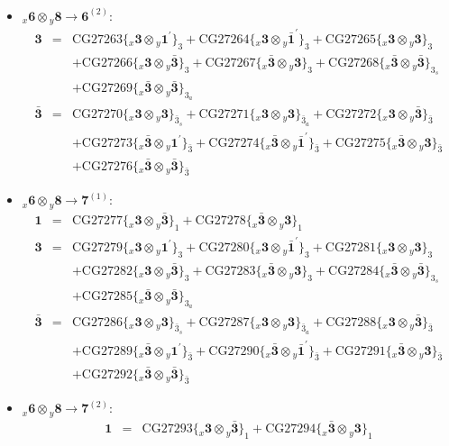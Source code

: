 \documentclass[english]{article}
\newcommand{\rep}[1]{\mathbf{#1}}
\newcommand{\repx}[2]{{}_{#2}\mathbf{#1}}
\newcommand{\subcg}[3]{\big\{ \repx{#1}{x}\otimes\repx{#2}{y}\big\}^{}_{#3}}
\begin{document}
\begin{itemize}
\begin{eqnarray*}
\end{eqnarray*}
\item $\repx{6}{x}\otimes\repx{8}{y}\to\rep{6}^{(2)}$:
\begin{eqnarray*}
\rep{3} &=& \text{CG27263}\subcg{3}{1^{\prime}}{3}+\text{CG27264}\subcg{3}{\bar{1}^{\prime}}{3}+\text{CG27265}\subcg{3}{3}{3} \\ 
 & & +\text{CG27266}\subcg{3}{\bar{3}}{3}+\text{CG27267}\subcg{\bar{3}}{3}{3}+\text{CG27268}\subcg{\bar{3}}{\bar{3}}{3_{s}} \\ 
 & & +\text{CG27269}\subcg{\bar{3}}{\bar{3}}{3_{a}}
\\
\rep{\bar{3}} &=& \text{CG27270}\subcg{3}{3}{\bar{3}_{s}}+\text{CG27271}\subcg{3}{3}{\bar{3}_{a}}+\text{CG27272}\subcg{3}{\bar{3}}{\bar{3}} \\ 
 & & +\text{CG27273}\subcg{\bar{3}}{1^{\prime}}{\bar{3}}+\text{CG27274}\subcg{\bar{3}}{\bar{1}^{\prime}}{\bar{3}}+\text{CG27275}\subcg{\bar{3}}{3}{\bar{3}} \\ 
 & & +\text{CG27276}\subcg{\bar{3}}{\bar{3}}{\bar{3}}
\end{eqnarray*}
\item $\repx{6}{x}\otimes\repx{8}{y}\to\rep{7}^{(1)}$:
\begin{eqnarray*}
\rep{1} &=& \text{CG27277}\subcg{3}{\bar{3}}{1}+\text{CG27278}\subcg{\bar{3}}{3}{1}
\\
\rep{3} &=& \text{CG27279}\subcg{3}{1^{\prime}}{3}+\text{CG27280}\subcg{3}{\bar{1}^{\prime}}{3}+\text{CG27281}\subcg{3}{3}{3} \\ 
 & & +\text{CG27282}\subcg{3}{\bar{3}}{3}+\text{CG27283}\subcg{\bar{3}}{3}{3}+\text{CG27284}\subcg{\bar{3}}{\bar{3}}{3_{s}} \\ 
 & & +\text{CG27285}\subcg{\bar{3}}{\bar{3}}{3_{a}}
\\
\rep{\bar{3}} &=& \text{CG27286}\subcg{3}{3}{\bar{3}_{s}}+\text{CG27287}\subcg{3}{3}{\bar{3}_{a}}+\text{CG27288}\subcg{3}{\bar{3}}{\bar{3}} \\ 
 & & +\text{CG27289}\subcg{\bar{3}}{1^{\prime}}{\bar{3}}+\text{CG27290}\subcg{\bar{3}}{\bar{1}^{\prime}}{\bar{3}}+\text{CG27291}\subcg{\bar{3}}{3}{\bar{3}} \\ 
 & & +\text{CG27292}\subcg{\bar{3}}{\bar{3}}{\bar{3}}
\end{eqnarray*}
\item $\repx{6}{x}\otimes\repx{8}{y}\to\rep{7}^{(2)}$:
\begin{eqnarray*}
\rep{1} &=& \text{CG27293}\subcg{3}{\bar{3}}{1}+\text{CG27294}\subcg{\bar{3}}{3}{1}
\\

\end{eqnarray*}
\end{itemize}
\end{document}
